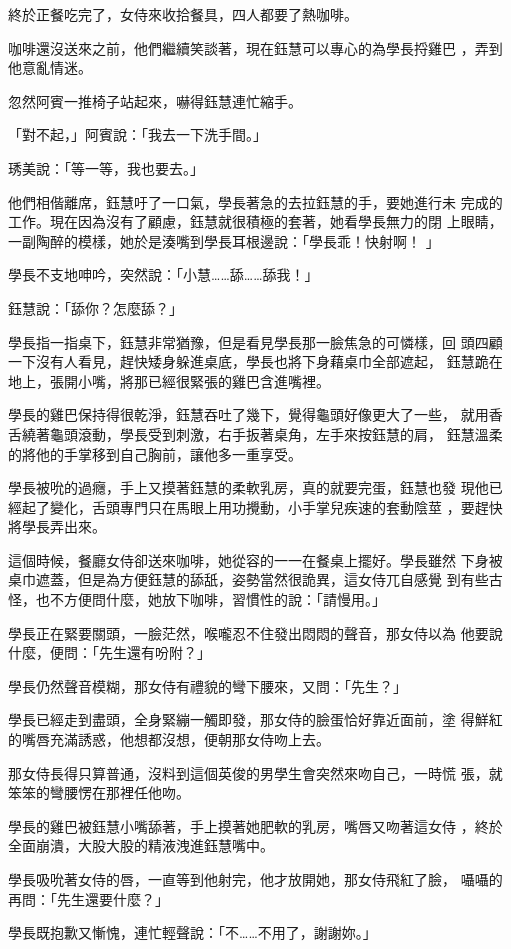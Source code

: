 終於正餐吃完了，女侍來收拾餐具，四人都要了熱咖啡。

咖啡還沒送來之前，他們繼續笑談著，現在鈺慧可以專心的為學長捋雞巴
，弄到他意亂情迷。

忽然阿賓一推椅子站起來，嚇得鈺慧連忙縮手。

「對不起，」阿賓說：「我去一下洗手間。」

琇美說：「等一等，我也要去。」

他們相偕離席，鈺慧吁了一口氣，學長著急的去拉鈺慧的手，要她進行未
完成的工作。現在因為沒有了顧慮，鈺慧就很積極的套著，她看學長無力的閉
上眼睛，一副陶醉的模樣，她於是湊嘴到學長耳根邊說：「學長乖！快射啊！
」

學長不支地呻吟，突然說：「小慧……舔……舔我！」

鈺慧說：「舔你？怎麼舔？」

學長指一指桌下，鈺慧非常猶豫，但是看見學長那一臉焦急的可憐樣，回
頭四顧一下沒有人看見，趕快矮身躲進桌底，學長也將下身藉桌巾全部遮起，
鈺慧跪在地上，張開小嘴，將那已經很緊張的雞巴含進嘴裡。

學長的雞巴保持得很乾淨，鈺慧吞吐了幾下，覺得龜頭好像更大了一些，
就用香舌繞著龜頭滾動，學長受到刺激，右手扳著桌角，左手來按鈺慧的肩，
鈺慧溫柔的將他的手掌移到自己胸前，讓他多一重享受。

學長被吮的過癮，手上又摸著鈺慧的柔軟乳房，真的就要完蛋，鈺慧也發
現他已經起了變化，舌頭專門只在馬眼上用功攪動，小手掌兒疾速的套動陰莖
，要趕快將學長弄出來。

這個時候，餐廳女侍卻送來咖啡，她從容的一一在餐桌上擺好。學長雖然
下身被桌巾遮蓋，但是為方便鈺慧的舔舐，姿勢當然很詭異，這女侍兀自感覺
到有些古怪，也不方便問什麼，她放下咖啡，習慣性的說：「請慢用。」

學長正在緊要關頭，一臉茫然，喉嚨忍不住發出悶悶的聲音，那女侍以為
他要說什麼，便問：「先生還有吩附？」

學長仍然聲音模糊，那女侍有禮貌的彎下腰來，又問：「先生？」

學長已經走到盡頭，全身緊繃一觸即發，那女侍的臉蛋恰好靠近面前，塗
得鮮紅的嘴唇充滿誘惑，他想都沒想，便朝那女侍吻上去。

那女侍長得只算普通，沒料到這個英俊的男學生會突然來吻自己，一時慌
張，就笨笨的彎腰愣在那裡任他吻。

學長的雞巴被鈺慧小嘴舔著，手上摸著她肥軟的乳房，嘴唇又吻著這女侍
，終於全面崩潰，大股大股的精液洩進鈺慧嘴中。

學長吸吮著女侍的唇，一直等到他射完，他才放開她，那女侍飛紅了臉，
囁囁的再問：「先生還要什麼？」

學長既抱歉又慚愧，連忙輕聲說：「不……不用了，謝謝妳。」

